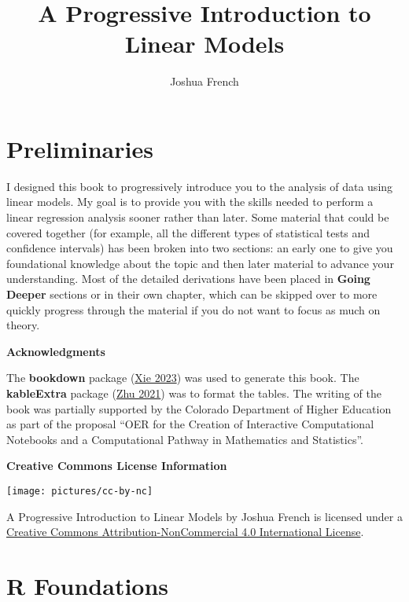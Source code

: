 \documentclass[
]{book}
\title{A Progressive Introduction to Linear Models}
\author{Joshua French}
\date{}
\theoremstyle{definition}
\theoremstyle{definition}
\theoremstyle{definition}
\theoremstyle{definition}
\theoremstyle{remark}
\begin{document}
\maketitle

{
\setcounter{tocdepth}{1}
\tableofcontents
}
\hypertarget{preliminaries}{%
\chapter*{Preliminaries}\label{preliminaries}}

I designed this book to progressively introduce you to the analysis of data using linear models. My goal is to provide you with the skills needed to perform a linear regression analysis sooner rather than later. Some material that could be covered together (for example, all the different types of statistical tests and confidence intervals) has been broken into two sections: an early one to give you foundational knowledge about the topic and then later material to advance your understanding. Most of the detailed derivations have been placed in \textbf{Going Deeper} sections or in their own chapter, which can be skipped over to more quickly progress through the material if you do not want to focus as much on theory.

\textbf{Acknowledgments}

The \textbf{bookdown} package (\protect\hyperlink{ref-R-bookdown}{Xie 2023}) was used to generate this book. The \textbf{kableExtra} package (\protect\hyperlink{ref-R-kableExtra}{Zhu 2021}) was to format the tables. The writing of the book was partially supported by the Colorado Department of Higher Education as part of the proposal ``OER for the Creation of Interactive Computational Notebooks and a Computational Pathway in Mathematics and Statistics''.

\textbf{Creative Commons License Information}

\texttt{[image: pictures/cc-by-nc]}

A Progressive Introduction to Linear Models by Joshua French is licensed under a \href{https://creativecommons.org/licenses/by-nc/4.0/}{Creative Commons Attribution-NonCommercial 4.0 International License}.

\hypertarget{r-foundations}{%
\chapter{R Foundations}\label{r-foundations}}
\end{document}

